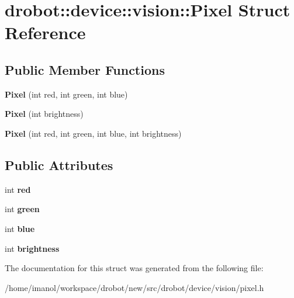 \hypertarget{structdrobot_1_1device_1_1vision_1_1Pixel}{\section{drobot\-:\-:device\-:\-:vision\-:\-:Pixel Struct Reference}
\label{structdrobot_1_1device_1_1vision_1_1Pixel}
}
\subsection*{Public Member Functions}
\begin{DoxyCompactItemize}
\item 
\hypertarget{structdrobot_1_1device_1_1vision_1_1Pixel_afa58aa9520fed71c437a96746d82e2f8}{{\bfseries Pixel} (int red, int green, int blue)}\label{structdrobot_1_1device_1_1vision_1_1Pixel_afa58aa9520fed71c437a96746d82e2f8}

\item 
\hypertarget{structdrobot_1_1device_1_1vision_1_1Pixel_a430772f0631d5286c777c40bbb40a88f}{{\bfseries Pixel} (int brightness)}\label{structdrobot_1_1device_1_1vision_1_1Pixel_a430772f0631d5286c777c40bbb40a88f}

\item 
\hypertarget{structdrobot_1_1device_1_1vision_1_1Pixel_af436a88672b0ddaff3dc333c9ddb113a}{{\bfseries Pixel} (int red, int green, int blue, int brightness)}\label{structdrobot_1_1device_1_1vision_1_1Pixel_af436a88672b0ddaff3dc333c9ddb113a}

\end{DoxyCompactItemize}
\subsection*{Public Attributes}
\begin{DoxyCompactItemize}
\item 
\hypertarget{structdrobot_1_1device_1_1vision_1_1Pixel_a265c4e311e5ea3c42b73868508a0f9fd}{int {\bfseries red}}\label{structdrobot_1_1device_1_1vision_1_1Pixel_a265c4e311e5ea3c42b73868508a0f9fd}

\item 
\hypertarget{structdrobot_1_1device_1_1vision_1_1Pixel_a6d57169f3294c397ecd9c25c30d4adae}{int {\bfseries green}}\label{structdrobot_1_1device_1_1vision_1_1Pixel_a6d57169f3294c397ecd9c25c30d4adae}

\item 
\hypertarget{structdrobot_1_1device_1_1vision_1_1Pixel_abb8ae018ebff8e8a5100006cbcf2e81d}{int {\bfseries blue}}\label{structdrobot_1_1device_1_1vision_1_1Pixel_abb8ae018ebff8e8a5100006cbcf2e81d}

\item 
\hypertarget{structdrobot_1_1device_1_1vision_1_1Pixel_ab6662ba55e20dce08e7c301eae98a934}{int {\bfseries brightness}}\label{structdrobot_1_1device_1_1vision_1_1Pixel_ab6662ba55e20dce08e7c301eae98a934}

\end{DoxyCompactItemize}


The documentation for this struct was generated from the following file\-:\begin{DoxyCompactItemize}
\item 
/home/imanol/workspace/drobot/new/src/drobot/device/vision/pixel.\-h\end{DoxyCompactItemize}
